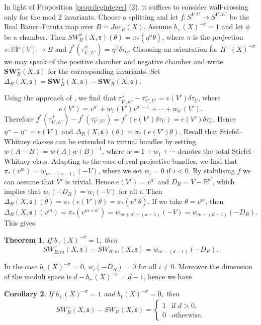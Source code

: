 \documentclass{amsart}
\newtheorem{theorem}{Theorem}[section]
\newtheorem{corollary}[theorem]{Corollary}
\theoremstyle{definition}
\theoremstyle{remark}
\numberwithin{equation}{section}
\begin{document}
In light of Proposition \ref{prop:deginteger} (2), it suffices to consider wall-crossing only for the mod $2$ invariants. Choose a splitting and let $f : S^{V,U} \to S^{V',U'}$ be the Real Bauer--Furuta map over $B = Jac_R(X)$. Assume $b_+(X)^{-\sigma} = 1$ and let $\phi$ be a chamber. Then $SW^\phi_R(X,\mathfrak{s})(\theta) = \pi_*( \eta^\phi \theta)$, where $\pi$ is the projection $\pi : \mathbb{RP}(V) \to B$ and $f^*( \tau^\phi_{V',U'}) = \eta^\phi \delta \tau_U$. Choosing an orientation for $H^+(X)^{-\sigma}$ we may speak of the positive chamber and negative chamber and write $\mathbf{SW}^{\pm}_R(X , \mathfrak{s})$ for the corresponding invariants. Set $\Delta_R(X,\mathfrak{s}) = \mathbf{SW}^+_R(X , \mathfrak{s}) - \mathbf{SW}^-_R(X,\mathfrak{s})$. 

Using the approach of \cite[]{bk}, we find that $\tau^+_{V',U'} - \tau^-_{V',U'} =  e(V') \delta \tau_{U}$, where 
\[
e(V') = v^{a'} + w_1(V') v^{a'-1} + \cdots + w_{a'}(V').
\]
Therefore $f^*(\tau^+_{V',U'}) - f^*(\tau^-_{V',U'}) = f^*( e(V') \delta \tau_U ) = e(V') \delta \tau_U$. Hence $\eta^+ - \eta^- = e(V')$ and $\Delta_R(X,\mathfrak{s})(\theta) = \pi_*( e(V')\theta)$. Recall that Stiefel--Whitney classes can be extended to virtual bundles by setting $w(A-B) = w(A)w(B)^{-1}$, where $w = 1 + w_1 + \cdots $ denotes the total Stiefel--Whitney class. Adapting \cite[Proposition 3.5]{bk} to the case of real projective bundles, we find that $\pi_*( v^m ) = w_{m-(a-1)}(-V)$, where we set $w_i = 0$ if $i < 0$. By stabilising $f$ we can assume that $V'$ is trivial. Hence $e(V') = v^{a'}$ and $D_R = V - \mathbb{R}^{a'}$, which implies that $w_i(-D_R) = w_i(-V)$ for all $i$. Then $\Delta_R(X,\mathfrak{s})(\theta) = \pi_*( e(V')\theta ) = \pi_*( v^{a'} \theta)$. If we take $\theta = v^m$, then 
\[
\Delta_R(X , \mathfrak{s})(v^m) = \pi_*( v^{m+a'} ) = w_{m+a'-(a-1)}(-V) = w_{m-(d-1)}(-D_R).
\]
This gives:
\begin{theorem}\label{thm:wcf}
If $b_+(X)^{-\sigma}=1$, then
\[
SW^+_{R,m}(X,\mathfrak{s}) - SW^-_{R,m}(X, \mathfrak{s}) = w_{m-(d-1)}(-D_R).
\]
\end{theorem}

In the case $b_1(X)^{-\sigma} = 0$, $w_i(-D_R) = 0$ for all $i \neq 0$. Moreover the dimension of the moduli space is $d - b_+(X)^{-\sigma} = d-1$, hence we have

\begin{corollary}
If $b_+(X)^{-\sigma} = 1$ and $b_1(X)^{-\sigma} = 0$, then
\[
SW^+_R(X,\mathfrak{s}) - SW^-_R(X,\mathfrak{s}) = \begin{cases} 1 & \text{if } d > 0, \\ 0 & \text{otherwise}. \end{cases}
\]
\end{corollary}
\end{document}
